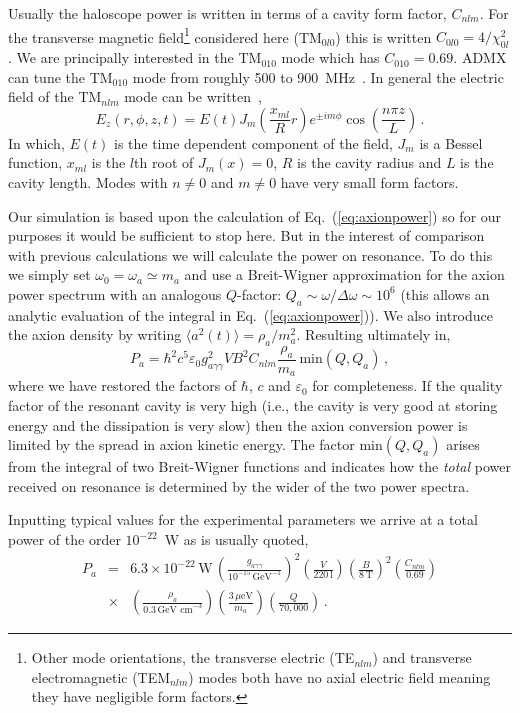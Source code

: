 Usually the haloscope power is written in terms of a cavity form factor, $C_{nlm}$. For the transverse magnetic field\footnote{Other mode orientations, the transverse electric (TE$_{nlm}$) and transverse electromagnetic (TEM$_{nlm}$) modes both have no axial electric field meaning they have negligible form factors.} considered here (TM$_{0l0}$) this is written $C_{0l0} = 4/\chi_{0l}^2$. We are principally interested in the TM$_{010}$ mode which has $C_{010} = 0.69$. ADMX can tune the TM$_{010}$ mode from roughly 500 to 900~MHz~\cite{Asztalos:2009yp}. In general the electric field of the TM$_{nlm}$ mode can be written~\cite{Jackson},
\begin{equation}
 E_z(r,\phi,z,t) = E(t)J_m{\left(\frac{x_{ml}}{R}r\right)}e^{\pm i m \phi} \cos{\left( \frac{n\pi z}{L} \right)}\, .
\end{equation}
In which, $E(t)$ is the time dependent component of the field, $J_m$ is a Bessel function, $x_{ml}$ is the $l$th root of $J_m(x)=0$, $R$ is the cavity radius and $L$ is the cavity length. Modes with $n\neq0$ and $m\neq0$ have very small form factors.

Our simulation is based upon the calculation of Eq.~(\ref{eq:axionpower}) so for our purposes it would be sufficient to stop here. But in the interest of comparison with previous calculations we will calculate the power on resonance. To do this we simply set $\omega_0 = \omega_a \simeq m_a$ and use a Breit-Wigner approximation for the axion power spectrum with an analogous $Q$-factor: $Q_a \sim \omega/\Delta \omega\sim 10^6$ (this allows an analytic evaluation of the integral in Eq.~(\ref{eq:axionpower})). We also introduce the axion density by writing $\langle a^2(t)\rangle = \rho_a/m_a^2$. Resulting ultimately in,
\begin{equation}
 P_a = \hbar^2 c^5 \varepsilon_0 g_{a\gamma\gamma}^2 V B^2 C_{nlm} \frac{\rho_a}{m_a} \, \textrm{min}(Q, Q_a) \,,
\end{equation}
where we have restored the factors of $\hbar$, $c$ and $\varepsilon_0$ for completeness. If the quality factor of the resonant cavity is very high (i.e., the cavity is very good at storing energy and the dissipation is very slow) then the axion conversion power is limited by the spread in axion kinetic energy. The factor $\textrm{min}(Q,Q_a)$ arises from the integral of two Breit-Wigner functions and indicates how the {\it total} power received on resonance is determined by the wider of the two power spectra.

Inputting typical values for the experimental parameters we arrive at a total power of the order $10^{-22}$~W as is usually quoted,
\begin{eqnarray}\label{eq:totalpower}
 P_a &=& 6.3 \times 10^{-22} \,\textrm{W} \,
 \left(\frac{g_{a\gamma\gamma}}{10^{-15} \, \textrm{GeV}^{-1}}\right)^2 \left(\frac{V}{220\, \textrm{l}}\right) \left(\frac{B}{8\, \textrm{T}}\right)^2 
\left(\frac{C_{nlm}}{0.69}\right) \nonumber \\
&\times &\left(\frac{\rho_a}{0.3\, \textrm{GeV cm}^{-3}}\right) \left(\frac{3 \, \mu\textrm{eV}}{m_a}\right) \left(\frac{Q}{70,000}\right) \, .
\end{eqnarray}

